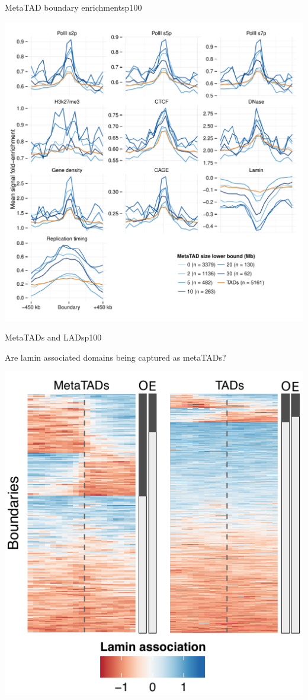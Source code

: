 \documentclass{beamer}
\begin{document}
\begin{frame}{MetaTAD boundary enrichments}{p100}

\centering
\includegraphics[width=.75\textwidth]{../figs/metatad_cutoffenrich.pdf}

\end{frame}

\begin{frame}{MetaTADs and LADs}{p100}

Are lamin associated domains being captured as metaTADs?

\centering
\includegraphics[width=.55\textwidth]{../figs/mt_laminsummary.pdf}

\end{frame}
\end{document}
